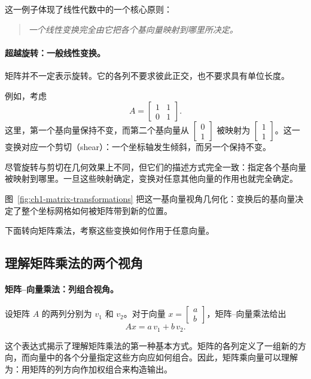 这一例子体现了线性代数中的一个核心原则：
\begin{quote}
\emph{一个线性变换完全由它把各个基向量映射到哪里所决定。}
\end{quote}

\paragraph{超越旋转：一般线性变换。}

矩阵并不一定表示旋转。它的各列不要求彼此正交，也不要求具有单位长度。

例如，考虑
\[
A =
\begin{bmatrix}
1 & 1 \\
0 & 1
\end{bmatrix}.
\]
这里，第一个基向量保持不变，而第二个基向量从
\(\begin{bmatrix}0 \\ 1\end{bmatrix}\) 被映射为 \(\begin{bmatrix}1 \\ 1\end{bmatrix}\)。这一变换对应一个剪切（shear）：一个坐标轴发生倾斜，而另一个保持不变。

尽管旋转与剪切在几何效果上不同，但它们的描述方式完全一致：指定各个基向量被映射到哪里。一旦这些映射确定，变换对任意其他向量的作用也就完全确定。

图~\ref{fig:ch1-matrix-transformations} 把这一基向量视角几何化：变换后的基向量决定了整个坐标网格如何被矩阵带到新的位置。



下面转向矩阵乘法，考察这些变换如何作用于任意向量。

\subsection{理解矩阵乘法的两个视角}

\paragraph{矩阵--向量乘法：列组合视角。}

设矩阵 \(A\) 的两列分别为 \(v_1\) 和 \(v_2\)。对于向量 \(x = \begin{bmatrix}a \\ b\end{bmatrix}\)，矩阵--向量乘法给出
\[
Ax = a\,v_1 + b\,v_2.
\]

这个表达式揭示了理解矩阵乘法的第一种基本方式。矩阵的各列定义了一组新的方向，而向量中的各个分量指定这些方向应如何组合。因此，矩阵乘向量可以理解为：用矩阵的列方向作加权组合来构造输出。

